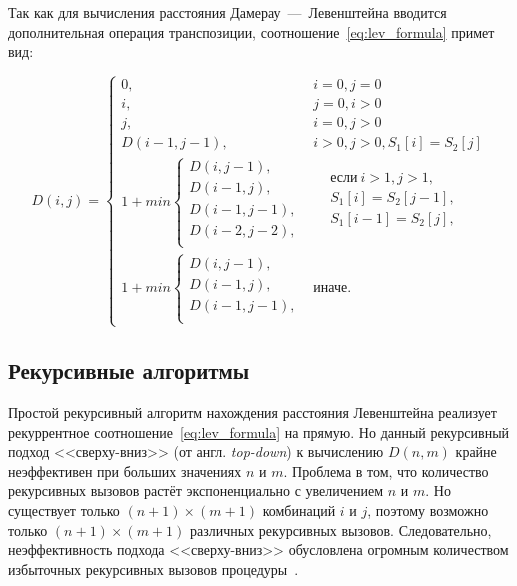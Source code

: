 Так как для вычисления расстояния Дамерау~---~Левенштейна вводится дополнительная операция транспозиции, соотношение~\ref{eq:lev_formula} примет вид:

\begin{equation}
\label{eqn:dam_lev_formula}
	D(i, j) = 
	\begin{cases}
		0, & i = 0, j = 0\\
            i, & j = 0, i > 0\\
            j, & i = 0, j > 0\\
            D(i-1, j-1), & i > 0, j > 0, S_1[i] = S_2[j]\\
		1 + min \begin{cases}
			D(i, j - 1),\\
			D(i - 1, j),\\
			D(i - 1, j - 1), \\
			D(i - 2, j - 2), \\
		\end{cases}
		& \begin{aligned}
			& \text{если} \ i > 1, j > 1, \\
			& S_{1}[i] = S_{2}[j - 1], \\
			& S_{1}[i - 1] = S_{2}[j], \\
		\end{aligned}\\
		1 + min \begin{cases}
			D(i, j - 1),\\
			D(i - 1, j), \\
			D(i - 1, j - 1), \\
		\end{cases}
		 & \text{иначе.}
	\end{cases}
\end{equation}

\subsection{Рекурсивные алгоритмы}\label{sect:recur_lev}

Простой рекурсивный алгоритм нахождения расстояния Левенштейна реализует рекуррентное соотношение~\ref{eq:lev_formula} на прямую. Но данный рекурсивный подход <<сверху-вниз>> (от англ. \textit{top-down}) к вычислению \(D(n, m)\) крайне неэффективен при больших значениях \(n\) и \(m\). Проблема в том, что количество рекурсивных вызовов растёт экспоненциально с увеличением \(n\) и \(m\). Но существует только \((n + 1) \times (m + 1)\) комбинаций \(i\) и \(j\), поэтому возможно только \((n + 1) \times (m + 1)\) различных рекурсивных вызовов. Следовательно, неэффективность подхода <<сверху-вниз>> обусловлена огромным количеством избыточных рекурсивных вызовов процедуры~\cite{cambridge}.

